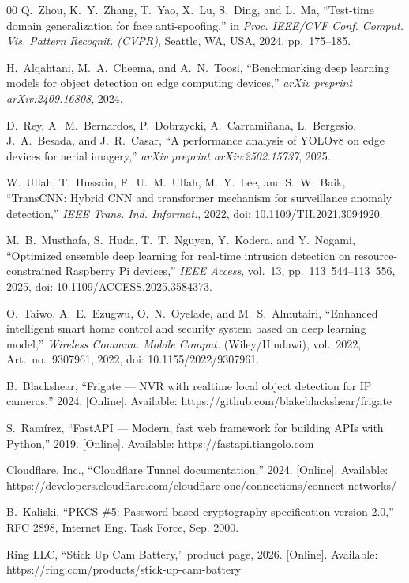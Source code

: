 \documentclass{ieeeaccess}
\begin{document}
\begin{thebibliography}{00}
 Q.~Zhou, K.~Y.~Zhang, T.~Yao, X.~Lu, S.~Ding, and L.~Ma, ``Test-time domain generalization for face anti-spoofing,'' in \emph{Proc. IEEE/CVF Conf. Comput. Vis. Pattern Recognit. (CVPR)}, Seattle, WA, USA, 2024, pp.~175--185.

 H.~Alqahtani, M.~A.~Cheema, and A.~N.~Toosi, ``Benchmarking deep learning models for object detection on edge computing devices,'' \emph{arXiv preprint arXiv:2409.16808}, 2024.

 D.~Rey, A.~M.~Bernardos, P.~Dobrzycki, A.~Carrami\~{n}ana, L.~Bergesio, J.~A.~Besada, and J.~R.~Casar, ``A performance analysis of YOLOv8 on edge devices for aerial imagery,'' \emph{arXiv preprint arXiv:2502.15737}, 2025.

 W.~Ullah, T.~Hussain, F.~U.~M.~Ullah, M.~Y.~Lee, and S.~W.~Baik, ``TransCNN: Hybrid CNN and transformer mechanism for surveillance anomaly detection,'' \emph{IEEE Trans. Ind. Informat.}, 2022, doi: 10.1109/TII.2021.3094920.

 M.~B.~Musthafa, S.~Huda, T.~T.~Nguyen, Y.~Kodera, and Y.~Nogami, ``Optimized ensemble deep learning for real-time intrusion detection on resource-constrained Raspberry Pi devices,'' \emph{IEEE Access}, vol.~13, pp.~113~544--113~556, 2025, doi: 10.1109/ACCESS.2025.3584373.

 O.~Taiwo, A.~E.~Ezugwu, O.~N.~Oyelade, and M.~S.~Almutairi, ``Enhanced intelligent smart home control and security system based on deep learning model,'' \emph{Wireless Commun. Mobile Comput.} (Wiley/Hindawi), vol.~2022, Art.~no.~9307961, 2022, doi: 10.1155/2022/9307961.

 B.~Blackshear, ``Frigate --- NVR with realtime local object detection for IP cameras,'' 2024. [Online]. Available: https://github.com/blakeblackshear/frigate

 S.~Ram\'{i}rez, ``FastAPI --- Modern, fast web framework for building APIs with Python,'' 2019. [Online]. Available: https://fastapi.tiangolo.com

 Cloudflare, Inc., ``Cloudflare Tunnel documentation,'' 2024. [Online]. Available: https://developers.cloudflare.com/cloudflare-one/connections/connect-networks/

 B.~Kaliski, ``PKCS \#5: Password-based cryptography specification version 2.0,'' RFC 2898, Internet Eng. Task Force, Sep. 2000.

 Ring LLC, ``Stick Up Cam Battery,'' product page, 2026. [Online]. Available: https://ring.com/products/stick-up-cam-battery


\end{thebibliography}
\end{document}
